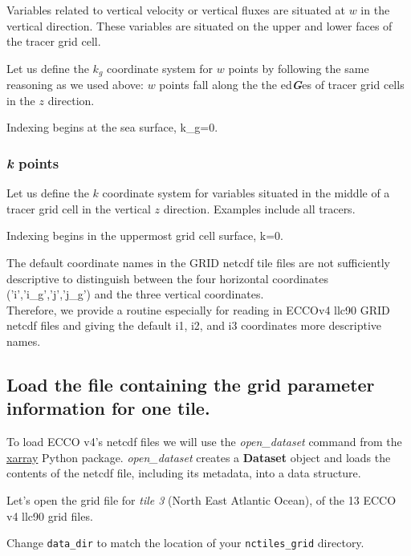 \documentclass[11pt]{article}
\begin{document}
Variables related to vertical velocity or vertical fluxes are situated
at \(w\) in the vertical direction. These variables are situated on the
upper and lower faces of the tracer grid cell.

Let us define the \(k_g\) coordinate system for \(w\) points by
following the same reasoning as we used above: \(w\) points fall along
the the ed\textbf{\emph{G}}es of tracer grid cells in the \(z\)
direction.

Indexing begins at the sea surface, k\_g=0.

\subsubsection{\texorpdfstring{\emph{k}
points}{k points}}\label{k-points}

Let us define the \(k\) coordinate system for variables situated in the
middle of a tracer grid cell in the vertical \(z\) direction. Examples
include all tracers.

Indexing begins in the uppermost grid cell surface, k=0.

The default coordinate names in the GRID netcdf tile files are not
sufficiently descriptive to distinguish between the four horizontal
coordinates ('i','i\_g','j','j\_g') and the three vertical
coordinates.\\
Therefore, we provide a routine especially for reading in ECCOv4 llc90
GRID netcdf files and giving the default i1, i2, and i3 coordinates more
descriptive names.

    \subsection{Load the file containing the grid parameter information for
one
tile.}\label{load-the-file-containing-the-grid-parameter-information-for-one-tile.}

To load ECCO v4's netcdf files we will use the \emph{open\_dataset}
command from the
\href{http://xarray.pydata.org/en/stable/index.html}{xarray} Python
package. \emph{open\_dataset} creates a \textbf{Dataset} object and
loads the contents of the netcdf file, including its metadata, into a
data structure.

Let's open the grid file for \emph{tile 3} (North East Atlantic Ocean),
of the 13 ECCO v4 llc90 grid files.

Change \texttt{data\_dir} to match the location of your
\texttt{nctiles\_grid} directory.
\end{document}
